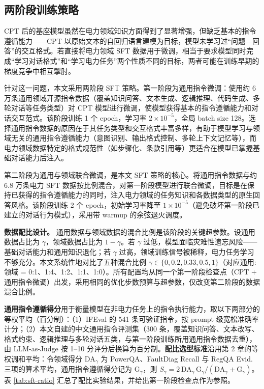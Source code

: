 \documentclass[fontset=fandol,type=master,campus=shenzhen,etitleauto=true]{hithesisbook}
\begin{document}
\subsection{两阶段训练策略}\label{ux4e24ux9636ux6bb5-sft-ux7b56ux7565}

CPT 后的基座模型虽然在电力领域知识方面得到了显著增强，但缺乏基本的指令遵循能力------CPT 以原始文本的自回归语言建模为目标，模型未学习过``问题---回答''的交互格式。若直接将电力领域 SFT 数据用于微调，相当于要求模型同时完成``学习对话格式''和``学习电力任务''两个性质不同的目标，两者可能在训练早期的梯度竞争中相互掣肘。

针对这一问题，本文采用两阶段 SFT 策略。第一阶段为通用指令微调：使用约 6 万条通用领域开源指令数据（覆盖知识问答、文本生成、逻辑推理、代码生成、多轮对话等任务类型）对 CPT 模型进行微调，使模型获得基本的指令遵循能力和对话交互范式。该阶段训练 1 个 epoch，学习率 $2 \times 10^{-5}$，全局 batch size 128。选择通用指令数据的原因在于其任务类型和交互格式丰富多样，有助于模型学习与领域无关的通用指令遵循能力（意图识别、输出格式控制、多轮上下文记忆等），而电力领域数据特定的格式规范性（如步骤化、条款引用等）更适合在模型已掌握基础对话能力后注入。

第二阶段为通用与领域联合微调，是本文 SFT 策略的核心。将通用指令数据与约 6.8 万条电力 SFT 数据按比例混合，对第一阶段模型进行联合微调，目标是在保持已获得的指令遵循能力的同时，注入电力领域的任务知识和各数据类型的原生回答风格。该阶段训练 2 个 epoch，初始学习率降至 $1 \times 10^{-5}$（避免破坏第一阶段已建立的对话行为模式），采用带 warmup 的余弦退火调度。

\textbf{数据配比设计。} 通用数据与领域数据的混合比例是该阶段的关键超参数。设通用数据占比为 $\gamma$，领域数据占比为 $1-\gamma$。若 $\gamma$ 过低，模型面临灾难性遗忘风险------基础对话能力和通用知识退化；若 $\gamma$ 过高，领域训练信号被稀释，电力任务学习不够充分。本文系统性地对比了五种混合比例 $\gamma \in \{0, 0.2, 0.33, 0.5, 1\}$（对应通用:领域 = 0:1、1:4、1:2、1:1、1:0）。所有配置均从同一个第一阶段检查点（CPT + 通用指令微调）出发，采用相同的优化步数预算与超参数，仅改变第二阶段的数据混合比例。

\textbf{通用指令遵循得分}用于衡量模型在非电力任务上的指令执行能力，取以下两部分的等权平均（百分制）：（1）IFEval\cite{ref85} 的 541 条可验证指令，按 prompt 级宽松准确率计分；（2）本文自建的中文通用指令评测集（300 条，覆盖知识问答、文本改写、格式约束、逻辑推理与多轮对话五类，与第一阶段训练所用通用指令数据去重），由 LLM-as-Judge 按 1--10 分评分后换算为百分制。\textbf{配比选型标准}沿用第 2 章的等权调和平均：令领域得分 $\text{DA}_\gamma$ 为 PowerQA、FaultDiag Recall 与 RegQA Evid. 三项的算术平均，通用指令遵循得分记为 $\text{G}_\gamma$，则 $S_\gamma = 2\,\text{DA}_\gamma\,\text{G}_\gamma / (\text{DA}_\gamma + \text{G}_\gamma)$。表 \ref{tab:sft-ratio} 汇总了配比实验结果，并给出第一阶段检查点作为参照。
\end{document}
